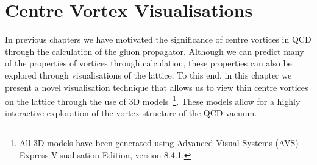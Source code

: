 
\chapter{Centre Vortex Visualisations}\label{chapter:Visualisations}
\ifpdf
    \graphicspath{{Chapter7/Figs/Raster/}{Chapter7/Figs/PDF/}{Chapter7/Figs/}}
\else
    \graphicspath{{Chapter7/Figs/Vector/}{Chapter7/Figs/}}
\fi

In previous chapters we have motivated the significance of centre vortices in QCD through the calculation of the gluon propagator. Although we can predict many of the properties of vortices through calculation, these properties can also be explored through visualisations of the lattice. To this end, in this chapter we present a novel visualisation technique that allows us to view thin centre vortices on the lattice through the use of 3D models~\footnote{All 3D models have been generated using Advanced Visual Systems (AVS) Express Visualisation Edition, version 8.4.1.}. These models allow for a highly interactive exploration of the vortex structure of the QCD vacuum.

